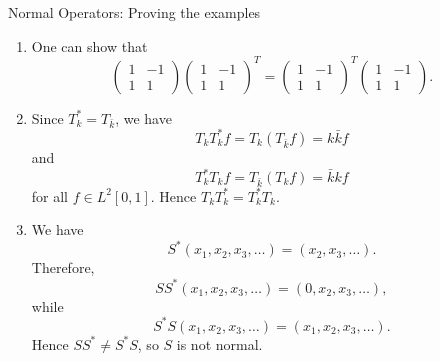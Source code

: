\documentclass[9pt, aspectratio=169]{beamer}
\begin{document}
\begin{frame}{Normal Operators: Proving the examples}
    \begin{enumerate}
    \item One can show that
    \[
    \begin{pmatrix}
    1 & -1\\
    1 & 1
    \end{pmatrix}
    \begin{pmatrix}
    1 & -1\\
    1 & 1
    \end{pmatrix}^{T}
    =
    \begin{pmatrix}
    1 & -1\\
    1 & 1
    \end{pmatrix}^{T}
    \begin{pmatrix}
    1 & -1\\
    1 & 1
    \end{pmatrix}.
    \]
\pause
    \item Since $T_k^*=T_{\bar{k}}$, we have
    \[
    T_kT_k^*f=T_k(T_{\bar{k}}f)=k\bar{k}f
    \]
    and
    \[
    T_k^*T_kf=T_{\bar{k}}(T_kf)=\bar{k}kf
    \]
    for all $f\in L^2[0,1]$. Hence $T_kT_k^*=T_k^*T_k$.
\pause
    \item We have
    \[
    S^*(x_1,x_2,x_3,\dots)=(x_2,x_3,\dots).
    \]
    Therefore,
    \[
    SS^*(x_1,x_2,x_3,\dots)=(0,x_2,x_3,\dots),
    \]
    while
    \[
    S^*S(x_1,x_2,x_3,\dots)=(x_1,x_2,x_3,\dots).
    \]
    Hence $SS^*\neq S^*S$, so $S$ is not normal.
\end{enumerate}
\end{frame}
\end{document}
